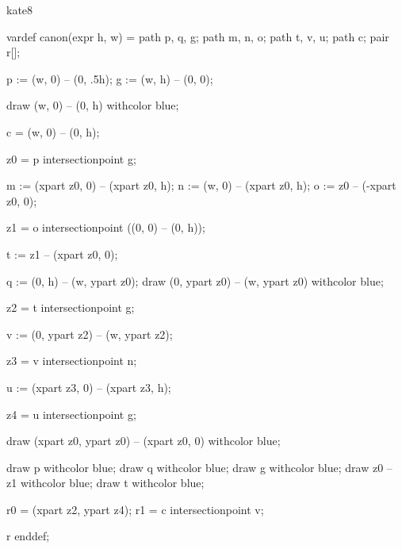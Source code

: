 

\startenvironment kate8

	\startMPdefinitions
		vardef canon(expr h, w) =
			path p, q, g;
			path m, n, o;
			path t, v, u;
			path c;
			pair r[];

			p := (w, 0) -- (0, .5h); %
			g := (w, h) -- (0, 0); %

			draw (w, 0) -- (0, h) withcolor blue;

			c = (w, 0) -- (0, h);

			z0 = p intersectionpoint g; %

			m := (xpart z0, 0) -- (xpart z0, h); %
			n := (w, 0) -- (xpart z0, h); %
			o := z0 -- (-xpart z0, 0); %

			z1 = o intersectionpoint ((0, 0) -- (0, h)); %

			t := z1 -- (xpart z0, 0); %

			q := (0, h) -- (w, ypart z0); %
			draw (0, ypart z0) -- (w, ypart z0) withcolor blue;

			z2 = t intersectionpoint g; %

			v := (0, ypart z2) -- (w, ypart z2); %

			z3 = v intersectionpoint n; %

			u := (xpart z3, 0) -- (xpart z3, h); %

			z4 = u intersectionpoint g; %

			draw (xpart z0, ypart z0) -- (xpart z0, 0) withcolor blue;

			draw p withcolor blue;
			draw q withcolor blue;
			draw g withcolor blue;
			draw z0 -- z1 withcolor blue;
			draw t withcolor blue;

			r0 = (xpart z2, ypart z4); %
			r1 = c intersectionpoint v; %

			r
		enddef;

	\stopMPdefinitions

\stopenvironment

